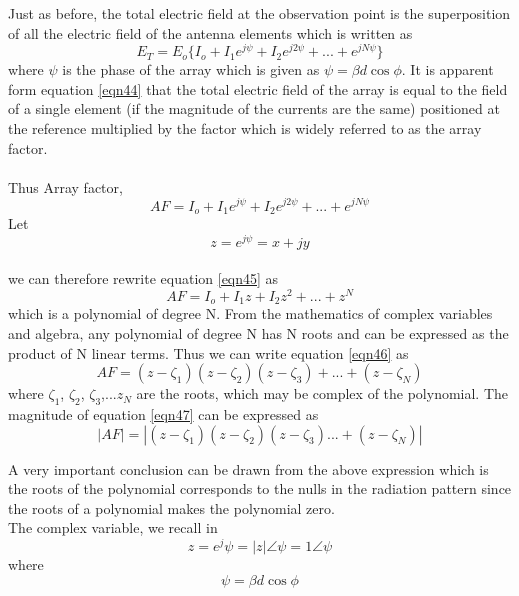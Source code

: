 	Just as before, the total electric field at the observation point is the superposition of all the electric field of the antenna elements which is written as 
	\begin{equation}
		E_{T}=E_{o}\{I_{o}+I_{1}e^{j\psi}+I_{2}e^{j2\psi}+...+e^{jN\psi}\}
		\label{eqn44}
	\end{equation}
    where $\psi$ is the phase of the array which is given as $\psi=\beta d\cos\phi$. It is apparent form equation \ref{eqn44} that the total electric field of the array is equal to the field of a single element (if the magnitude of the currents are the same) positioned at the reference multiplied by the factor which is widely referred to as the array factor. 
    \\\\
    Thus Array factor,
	\begin{equation}
		AF=I_{o}+I_{1}e^{j\psi}+I_{2}e^{j2\psi}+...+e^{jN\psi}
		\label{eqn45}
	\end{equation}
    Let $$z=e^{j\psi}=x+jy$$\\
    we can therefore rewrite equation \ref{eqn45} as
    \begin{equation}
    	AF=I_{o}+I_{1}z+I_{2}z^{2}+...+z^N
    	\label{eqn46}
    \end{equation}
    which is a polynomial of degree N. From the mathematics of complex variables and algebra, any polynomial of degree N has N roots and can be expressed as the product of N linear terms. Thus we can write equation \ref{eqn46} as 
    \begin{equation}
    	AF=(z-\zeta_1)(z-\zeta_2)(z-\zeta_3)+...+(z-\zeta_N)
    	\label{eqn47}
    \end{equation}
	where $\zeta_{1}$, $\zeta_{2}$, $\zeta_{3}$,...$z_{N}$ are the roots, which may be complex of the polynomial. The magnitude of equation \ref{eqn47} can be expressed as
	\begin{equation}
		|AF|=|(z-\zeta_1)(z-\zeta_2)(z-\zeta_3)...+(z-\zeta_N)|
		\label{eqn48}
	\end{equation}
	
	A very important conclusion can be drawn from the above expression which is the roots of the polynomial corresponds to the nulls in the radiation pattern since the roots of a polynomial makes the polynomial zero.
	\\
	The complex variable, we recall in 
	$$z=e^j{\psi}=|z|\angle\psi = 1\angle\psi$$
	where $$\psi=\beta d\cos\phi$$
	\\\\
	
